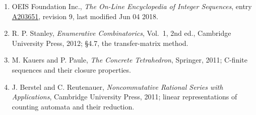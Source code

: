 \documentclass[11pt]{article}
\theoremstyle{definition}
\begin{document}
\begin{enumerate}

\item OEIS Foundation Inc., \emph{The On-Line Encyclopedia of Integer Sequences}, entry \href{https://oeis.org/A203651}{A203651}, revision 9, last modified Jun 04 2018.

\item R. P. Stanley, \emph{Enumerative Combinatorics}, Vol.~1, 2nd ed., Cambridge University Press, 2012; \S4.7, the transfer-matrix method.

\item M. Kauers and P. Paule, \emph{The Concrete Tetrahedron}, Springer, 2011; C-finite sequences and their closure properties.

\item J. Berstel and C. Reutenauer, \emph{Noncommutative Rational Series with Applications}, Cambridge University Press, 2011; linear representations of counting automata and their reduction.

\end{enumerate}
\end{document}
